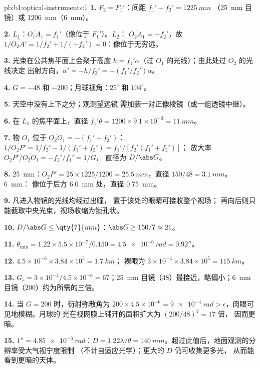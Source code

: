 \begin{solution}{pb:b1:optical-instruments:1}
\textbf{1.} $F_2 = F_1'$：间距 $f_1' + f_2' = \qty{1225}{mm}$
（\qty{25}{mm} 目镜）或 \qty{1206}{mm}（\qty{6}{mm}）。

\textbf{2.} $L_1$：$\overline{O_1A_1} = f_1'$（像位于 $F_1'$）。$L_2$：
$\overline{O_2A_1} = -f_2'$，故 $1/\overline{O_2A'} = 1/f_2' + 1/(-f_2')
= 0$：像位于无穷远。

\textbf{3.} 光束在公共焦平面上会聚于高度 $h =
f_1'\alpha$（过 $O_1$ 的光线）；由此处过 $O_2$ 的光线决定
出射方向，$\alpha' = -h/f_2' = -(f_1'/f_2')\alpha$。

\textbf{4.} $G = -48$ 和 $-200$；月球视角：$25^\circ$ 和 $104^\circ$。

\textbf{5.} 天空中没有上下之分；观测望远镜
需加装一对正像棱镜（或一组透镜中继）。

\textbf{6.} 在 $L_1$ 的焦平面上，直径 $f_1'\theta = 1200 \times
9.1\times10^{-3} = \qty{11}{mm}$。

\textbf{7.} 物 $O_1$ 位于 $\overline{O_2O_1} = -(f_1' + f_2')$：
$1/\overline{O_2P'} = 1/f_2' - 1/(f_1' + f_2') = f_1'/[f_2'(f_1' + f_2')]$；
放大率 $\overline{O_2P'}/\overline{O_2O_1} = -f_2'/f_1' = 1/G$，
直径为 $D/\abs G$。

\textbf{8.} \qty{25}{mm}：$\overline{O_2P'} = 25 \times 1225/1200 =
\qty{25.5}{mm}$，直径 $150/48 = \qty{3.1}{mm}$。\qty{6}{mm}：
像位于后方 \qty{6.0}{mm} 处，直径 \qty{0.75}{mm}。

\textbf{9.} 凡进入物镜的光线均经过出瞳，
置于该处的眼睛可接收整个视场；
再向后则只能截取中央光束，视场收缩为锁孔状。

\textbf{10.} $D/\abs G \leq \qty{7}{mm}$：$\abs G \geq 150/7 \approx 21$。

\textbf{11.} $\theta_{\min} = 1.22 \times 5.5\times10^{-7}/0.150 =
\qty{4.5e-6}{rad} = 0.92''$。

\textbf{12.} $4.5\times10^{-6} \times 3.84\times10^5 = \qty{1.7}{km}$；
裸眼为 $3\times10^{-4} \times 3.84\times10^5 = \qty{115}{km}$。

\textbf{13.} $G_r = 3\times10^{-4}/4.5\times10^{-6} = 67$；\qty{25}{mm}
目镜（$48$）最接近，略偏小；\qty{6}{mm}
目镜（$200$）约为所需的三倍。

\textbf{14.} 当 $G = 200$ 时，衍射弥散角为 $200 \times 4.5
\times10^{-6} = \qty{9e-4}{rad} > \epsilon$，肉眼可见地模糊。月球的
光在视网膜上铺开的面积扩大为 $(200/48)^2 = 17$ 倍，
因而更暗。

\textbf{15.} $1'' = \qty{4.85e-6}{rad}$：$D = 1.22\lambda/\theta =
\qty{140}{mm}$。超过此值后，地面观测的分辨率受大气视宁度限制
（不计自适应光学）；更大的 $D$ 仍可收集更多光，
从而能看到更暗的天体。


\end{solution}
